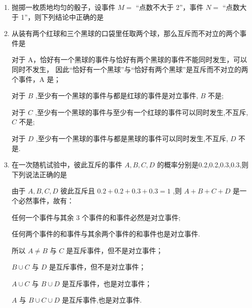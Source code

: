 \begin{enumerate}
\begin{enumerate}
        
        \item 抛掷一枚质地均匀的骰子，设事件 $M =$ “点数不大于 2”，事件 $N =$ “点数大于 1”，则下列结论中正确的是

        
        \item 从装有两个红球和三个黑球的口袋里任取两个球，那么互斥而不对立的两个事件是
        \begin{jieda}
            对于 A，恰好有一个黑球的事件与恰好有两个黑球的事件不能同时发生，可以同时不发生， 因此“恰好有一个黑球”与“恰好有两个黑球”是互斥而不对立的两个事件，A 是；
            
            对于 ${B}$ ,至少有一个黑球的事件与都是红球的事件是对立事件, ${B}$ 不是;
            
            对于 ${C}$ ,至少有一个黑球的事件与至少有一个红球的事件可以同时发生,不互斥, ${C}$ 不是;
            
            对于 ${D}$ ,至少有一个黑球的事件与都是黑球的事件可以同时发生,不互斥, ${D}$ 不是.
        \end{jieda}
        
        \item 在一次随机试验中，彼此互斥的事件 $A,B,C,D$ 的概率分别是0.2,0.2,0.3,0.3,则下列说法正确的是
        \begin{jieda}
            由于 $A,B,C,D$ 彼此互斥且 ${0.2} + {0.2} + {0.3} + {0.3} = 1$ ,则 $A + B + C + D$ 是一个必然事件，故有：
            
            任何一个事件与其余 3 个事件的和事件必然是对立事件;
            
            任何两个事件的和事件与其余两个事件的和事件也是对立事件.
            
            所以 $A \neq  B$ 与 $C$ 是互斥事件，但不是对立事件；
            
            $B \cup C$ 与 $D$ 是互斥事件，但不是对立事件；
            
            $A \cup C$ 与 $B \cup D$ 是互斥事件，也是对立事件；
            
            $A$ 与 $B \cup C \cup D$ 是互斥事件,也是对立事件.
        \end{jieda}
        

\end{enumerate}
\end{enumerate}

